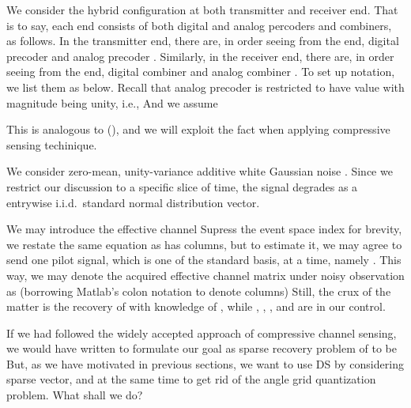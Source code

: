 We consider the hybrid configuration at both transmitter and receiver end.
That is to say, each end consists of both digital and analog percoders and combiners, as follows.
In the transmitter end, there are, in order seeing from the end, digital precoder  and analog precoder .
Similarly, in the receiver end, there are, in order seeing from the end, digital combiner  and analog combiner .
To set up notation, we list them as below.
%
%
Recall that analog precoder is restricted to have value with magnitude being unity, i.e.,
%
%
And we assume

This is analogous to (), and we will exploit the fact when applying compressive sensing techinique.

We consider zero-mean, unity-variance additive white Gaussian noise .
Since we restrict our discussion to a specific slice of time, the signal  degrades as a entrywise i.i.d.\ standard normal distribution vector.

We may introduce the effective channel
%
%
Supress the event space index for brevity, we restate the same equation as
%
 has  columns, but to estimate it, we may agree to send one pilot signal, which is one of the standard basis, at a time, namely .
This way, we may denote the acquired effective channel matrix  under noisy observation as (borrowing Matlab's colon notation to denote columns)
%
%
Still, the crux of the matter is the recovery of  with knowledge of , while , , , and  are in our control.

\stopsection
\startsection [title={Vectorization}]

If we had followed the widely accepted approach of compressive channel sensing, we would have written
%
%
to formulate our goal as sparse recovery problem of  to be
%
%
But, as we have motivated in previous sections, we want to use DS by considering sparse vector, and at the same time to get rid of the angle grid quantization problem.
What shall we do?

